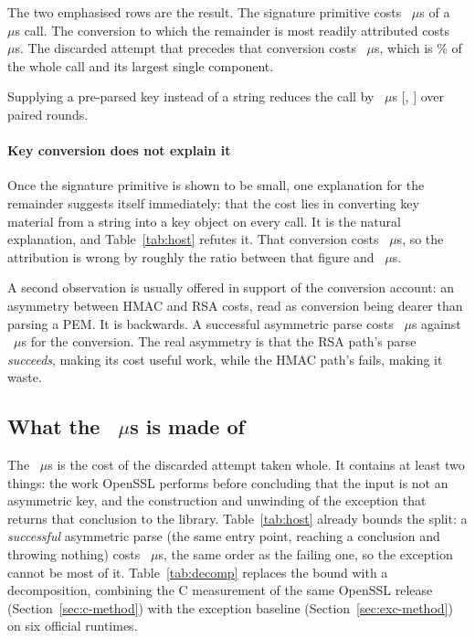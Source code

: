 \documentclass[preprint,12pt,authoryear]{elsarticle}
\begin{document}
The two emphasised rows are the result. The signature primitive costs
\HostHmacString~$\mu$s of a \HostJwtString~$\mu$s call. The conversion to which
the remainder is most readily attributed costs
\HostCreateSecretKey~$\mu$s. The discarded attempt that precedes that conversion
costs \HostProbeThrows~$\mu$s, which is \HostProbeShareOfCall\% of the whole call
and its largest single component.

Supplying a pre-parsed key instead of a string reduces the call by
\HostStringPenalty~$\mu$s [\HostStringPenaltyCiLo, \HostStringPenaltyCiHi] over
\HostStringPenaltyRounds{} paired rounds.

\paragraph{Key conversion does not explain it} Once the signature primitive is
shown to be small, one explanation for the remainder suggests itself immediately:
that the cost lies in converting key material from a string into a key object on
every call. It is the natural explanation, and Table~\ref{tab:host} refutes
it. That conversion costs
\HostCreateSecretKey~$\mu$s, so the attribution is wrong by roughly the ratio
between that figure and \HostProbeThrows~$\mu$s.

A second observation is usually offered in support of the conversion account: an
asymmetry between HMAC and RSA costs, read as conversion being dearer than
parsing a PEM. It is backwards. A successful asymmetric parse costs
\HostProbeSucceeds~$\mu$s against \HostCreateSecretKey~$\mu$s for the
conversion. The real asymmetry is that the RSA path's parse \emph{succeeds},
making its cost useful work, while the HMAC path's fails, making it waste.

\subsection{What the \texorpdfstring{\HostProbeThrows~$\mu$s}{18 us} is made
of}\label{sec:granularity}

The \HostProbeThrows~$\mu$s is the cost of the discarded attempt taken whole. It
contains at least two things: the work OpenSSL performs before concluding that
the input is not an asymmetric key, and the construction and unwinding of the
exception that returns that conclusion to the library. Table~\ref{tab:host}
already bounds the split: a \emph{successful} asymmetric parse (the same
entry point, reaching a conclusion and throwing nothing) costs
\HostProbeSucceeds~$\mu$s, the same order as the failing one, so the exception
cannot be most of it. Table~\ref{tab:decomp} replaces the bound with a
decomposition, combining the C measurement of the same OpenSSL release
(Section~\ref{sec:c-method}) with the exception baseline
(Section~\ref{sec:exc-method}) on six official runtimes.
\end{document}
